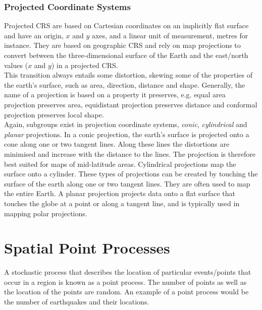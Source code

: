 \subsubsection*{Projected Coordinate Systems}
Projected CRS are based on Cartesian coordinates on an implicitly flat surface and have an origin, $x$ and $y$ axes, and a linear unit of measurement, metres for instance. They are based on geographic CRS and rely on map projections to convert between the three-dimensional surface of the Earth and the east/north values ($x$ and $y$) in a projected CRS.\\
This transition always entails some distortion, skewing some of the properties of the earth's surface, such as area, direction, distance and shape. Generally, the name of a projection is based on a property it preserves, e.g. equal area projection preserves area, equidistant projection preserves distance and conformal projection preserves local shape. \\
Again, subgroups exist in projection coordinate systems, \textit{conic}, \textit{cylindrical} and \textit{planar} projections. In a conic projection, the earth's surface is projected onto a cone along one or two tangent lines. Along these lines the distortions are minimised and increase with the distance to the lines. The projection is therefore best suited for maps of mid-latitude areas. Cylindrical projections map the surface onto a cylinder. These types of projections can be created by touching the surface of the earth along one or two tangent lines. They are often used to map the entire Earth. A planar projection projects data onto a flat surface that touches the globe at a point or along a tangent line, and is typically used in mapping polar projections\autocite[Cf.][]{lovelace2019geocomputation}.
\clearpage
\section{Spatial Point Processes}
A stochastic process that describes the location of particular events/points that occur in a region is known as a point process. The number of points as well as the location of the points are random. An example of a point process would be the number of earthquakes and their locations.
